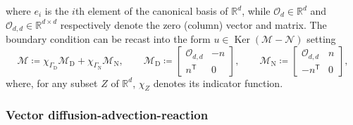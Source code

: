 \documentclass[11pt,a4paper]{article}
\theoremstyle{plain}
\theoremstyle{remark}
\theoremstyle{definition}
\newcommand{\Real}{\mathbb{R}}
\newcommand{\trans}{\mathsf{T}}
\DeclareMathOperator{\Ker}{Ker}
\newcommand{\dirichlet}{\mathrm{D}}
\newcommand{\neumann}{\mathrm{N}}
\begin{document}
where $e_i$ is the $i$th element of the canonical basis of $\Real^d$,
while $\mathcal{O}_d \in \Real^d$ and $\mathcal{O}_{d,d} \in \Real^{d \times d}$ respectively denote the zero (column) vector and matrix.
The boundary condition can be recast into the form $u\in\Ker(\mathcal{M}-\mathcal{N})$ setting
\[
\mathcal{M} \coloneqq \chi_{\Gamma_\dirichlet} \mathcal{M}_\dirichlet + \chi_{\Gamma_\neumann} \mathcal{M}_\neumann,
\qquad
\mathcal{M}_\dirichlet \coloneqq
\begin{bmatrix}
  \mathcal{O}_{d,d} & -n\\
  n^\trans & 0
\end{bmatrix},
\qquad
\mathcal{M}_\neumann \coloneqq
\begin{bmatrix}
  \mathcal{O}_{d,d} & n\\
  -n^\trans & 0
\end{bmatrix},
\]
where, for any subset $Z$ of $\Real^d$, $\chi_Z$ denotes its indicator function.

\subsubsection{Vector diffusion-advection-reaction}\label{subsubsec:vector-dar}
\end{document}
